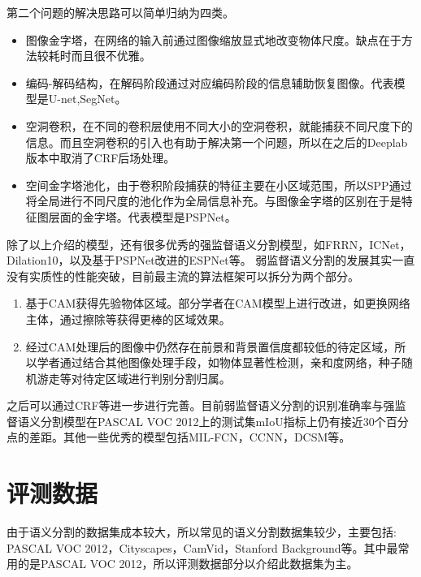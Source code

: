 \documentclass{article}
\begin{document}
\begin{CJK}{UTF8}{gbsn}
第二个问题的解决思路可以简单归纳为四类。
\begin{itemize}
    \item 图像金字塔，在网络的输入前通过图像缩放显式地改变物体尺度。缺点在于方法较耗时而且很不优雅。
    \item 编码-解码结构，在解码阶段通过对应编码阶段的信息辅助恢复图像。代表模型是U-net\cite{ronneberger2015u},SegNet\cite{badrinarayanan2017segnet}。
    \item 空洞卷积，在不同的卷积层使用不同大小的空洞卷积，就能捕获不同尺度下的信息。而且空洞卷积的引入也有助于解决第一个问题，所以在之后的Deeplab\cite{chen2014semantic}版本中取消了CRF\cite{lafferty2001conditional}后场处理。
    \item 空间金字塔池化，由于卷积阶段捕获的特征主要在小区域范围，所以SPP通过将全局进行不同尺度的池化作为全局信息补充。与图像金字塔的区别在于是特征图层面的金字塔。代表模型是PSPNet\cite{zhao2017pyramid}。
\end{itemize}

除了以上介绍的模型，还有很多优秀的强监督语义分割模型，如FRRN\cite{pohlen2017full}，ICNet\cite{zhao2018icnet}，Dilation10\cite{yu2015multi}，以及基于PSPNet改进的ESPNet\cite{mehta2018espnet}等。
弱监督语义分割的发展其实一直没有实质性的性能突破，目前最主流的算法框架可以拆分为两个部分。
\begin{enumerate}
    \item 基于CAM\cite{zhou2016learning}获得先验物体区域。部分学者在CAM\cite{zhou2016learning}模型上进行改进，如更换网络主体，通过擦除等获得更棒的区域效果。
    \item 经过CAM\cite{zhou2016learning}处理后的图像中仍然存在前景和背景置信度都较低的待定区域，所以学者通过结合其他图像处理手段，如物体显著性检测，亲和度网络，种子随机游走等对待定区域进行判别分割归属。
\end{enumerate}

之后可以通过CRF等进一步进行完善。目前弱监督语义分割的识别准确率与强监督语义分割模型在PASCAL VOC 2012上的测试集mIoU指标上仍有接近30个百分点的差距。其他一些优秀的模型包括MIL-FCN\cite{pathak2014fully}，CCNN\cite{pathak2015constrained}，DCSM\cite{shimoda2016distinct}等。

\section{评测数据}
由于语义分割的数据集成本较大，所以常见的语义分割数据集较少，主要包括: PASCAL VOC 2012\cite{pascal-voc-2012}，Cityscapes，CamVid\cite{brostow2008segmentation,brostow2009semantic}，Stanford Background\cite{liu2010single,saxena2006learning,saxena2007learning}等。其中最常用的是PASCAL VOC 2012，所以评测数据部分以介绍此数据集为主。


\end{CJK}
\end{document}
